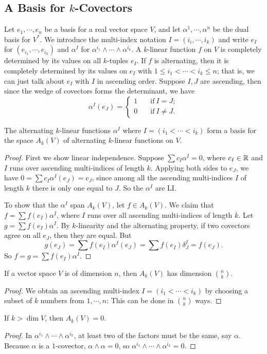 \subsection{A Basis for $k$-Covectors}
Let $e_1,\cdots ,e_n $ be a basis for a real vector space $V$, and let $\alpha ^1,\cdots ,\alpha ^n $ be the dual basis for $V^*$. We introduce the multi-index notation $I=(i_i ,\cdots ,i_k)$ and write $e_I$ for $(e_{i_1},\cdots ,e_{i_k})$ and $\alpha ^I$ for $\alpha ^{i_1}\wedge \cdots \wedge \alpha ^{i_k}$. A $k$-linear function $f$ on $V$ is completely determined by its values on all $k$-tuples $e_I$. If $f$ is alternating, then it is completely determined by its values on $e_I$ with $1\leq i_1< \cdots  < i_k \leq n$; that is, we can just talk about $e_I$ with $I$ in ascending order. Suppose $I,J$ are ascending, then since the wedge of covectors forms the determinant, we have \[
    \alpha ^I (e_J) = 
    \begin{cases}
        1 \quad & \text{if} \ I=J;\\
        0& \text{if} \ I\neq J.

    \end{cases}
\] 
\begin{prop}
    The alternating $k$-linear functions $\alpha ^I$ where $I=(i_1<\cdots < i_k)$ form a basis for the space $A_k(V)$ of alternating $k$-linear functions on $V$.
\end{prop}
\begin{proof}
    First we show linear independence. Suppose $\sum c_I \alpha ^I=0$, where $c_I\in \mathbb{R}$ and $I$ runs over ascending multi-indices of length $k$. Applying both sides to $e_J$, we have $0=\sum c_I\alpha ^I(e_J)=c_J$, since among all the ascending multi-indices $I$ of length $k$ there is only one equal to $J$. So the $\alpha ^I$ are LI.

    To show that the $\alpha ^I$ span $A_k(V)$, let $f\in A_k(V)$. We claim that $f=\sum f(e_I)\alpha ^I$, where $I$ runs over all ascending multi-indices of length $k$. Let $g=\sum f(e_I)\alpha ^I$. By $k$-linearity and the alternating property, if two covectors agree on all $e_J$, then they are equal. But \[
        g(e_J)=\sum f(e_I)\alpha ^I(e_J)=\sum f(e_I)\delta^I_J=f(e_J).
    \] So $f=g=\sum f(e_I)\alpha ^I$.
\end{proof}
\begin{cor}
    If a vector space $V$ is of dimension $n$, then $A_k(V)$ has dimension ${n \choose k}$.
\end{cor}
\begin{proof}
    We obtain an ascending multi-index $I=(i_1<\cdots < i_k)$ by choosing a subset of $k$ numbers from $1,\cdots ,n$: This can be done in ${n \choose k}$ ways.
\end{proof}
\begin{cor}
    If $k> \dim V$, then $A_k(V)=0$.
\end{cor}
\begin{proof}
    In $\alpha ^{i_1}\wedge \cdots \wedge \alpha ^{i_k}$, at least two of the factors must be the same, say $\alpha $. Because $\alpha $ is a $1$-covector, $\alpha \wedge \alpha =0$, so $\alpha ^{i_1}\wedge \cdots \wedge \alpha ^{i_k}=0$.
\end{proof}


